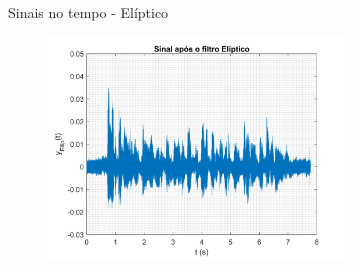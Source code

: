 \begin{frame}{Sinais no tempo - Elíptico}
    \begin{figure}
        \centering
        \includegraphics[width=0.7\textwidth]{graficos/filtrados_t_e.png}
    \end{figure}
\end{frame}

